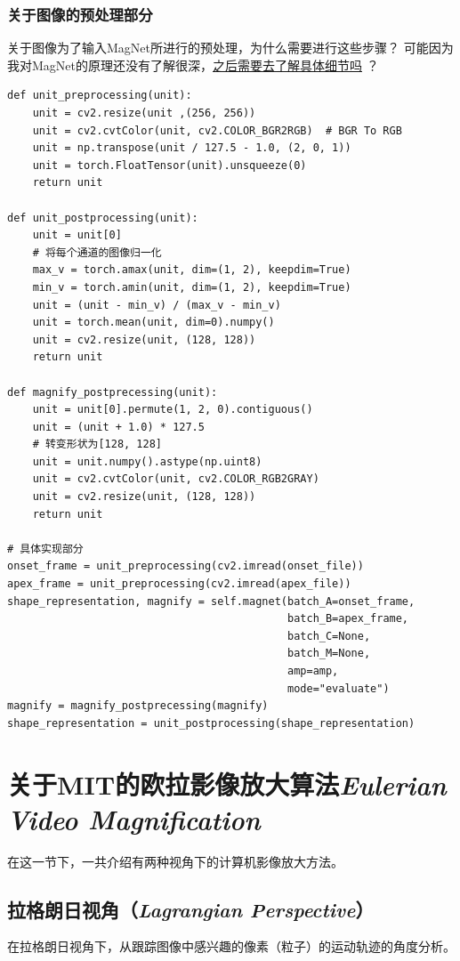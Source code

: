 \documentclass[AutoFakeBold]{MyFormat}
\begin{document}
\subsection{关于图像的预处理部分}
\par 关于图像为了输入MagNet所进行的预处理，为什么需要进行这些步骤？
可能因为我对MagNet的原理还没有了解很深，\underline{之后需要去了解具体细节吗}
？
\begin{lstlisting}
def unit_preprocessing(unit):
    unit = cv2.resize(unit ,(256, 256))
    unit = cv2.cvtColor(unit, cv2.COLOR_BGR2RGB)  # BGR To RGB
    unit = np.transpose(unit / 127.5 - 1.0, (2, 0, 1))
    unit = torch.FloatTensor(unit).unsqueeze(0)
    return unit

def unit_postprocessing(unit):
    unit = unit[0]
    # 将每个通道的图像归一化
    max_v = torch.amax(unit, dim=(1, 2), keepdim=True)
    min_v = torch.amin(unit, dim=(1, 2), keepdim=True)
    unit = (unit - min_v) / (max_v - min_v)
    unit = torch.mean(unit, dim=0).numpy()
    unit = cv2.resize(unit, (128, 128))
    return unit

def magnify_postprecessing(unit):
    unit = unit[0].permute(1, 2, 0).contiguous()
    unit = (unit + 1.0) * 127.5
    # 转变形状为[128, 128]
    unit = unit.numpy().astype(np.uint8)
    unit = cv2.cvtColor(unit, cv2.COLOR_RGB2GRAY)
    unit = cv2.resize(unit, (128, 128))
    return unit

# 具体实现部分
onset_frame = unit_preprocessing(cv2.imread(onset_file))
apex_frame = unit_preprocessing(cv2.imread(apex_file))
shape_representation, magnify = self.magnet(batch_A=onset_frame,
                                            batch_B=apex_frame,
                                            batch_C=None,
                                            batch_M=None,
                                            amp=amp,
                                            mode="evaluate")
magnify = magnify_postprecessing(magnify)
shape_representation = unit_postprocessing(shape_representation)
\end{lstlisting}



\chapter{关于MIT的欧拉影像放大算法\textit{Eulerian Video Magnification}}

\par 在这一节下，一共介绍有两种视角下的计算机影像放大方法。
\section{拉格朗日视角（\textit{Lagrangian Perspective}）}
\par 在拉格朗日视角下，从跟踪图像中感兴趣的像素（粒子）的运动轨迹的角度分析。
\end{document}
